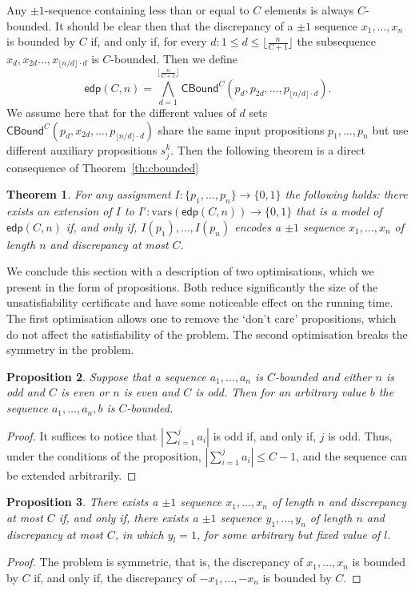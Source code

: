 \documentclass{article} \usepackage[utf8]{inputenc}
\newcommand*{\csf}{\ensuremath{{s}}}
\newcommand*{\vars}{\ensuremath{\mathrm{vars}}}
\newcommand*{\CBound}{\ensuremath{\mathsf{CBound}}}
\newcommand*{\edp}{\ensuremath{\mathsf{edp}}}
\newtheorem{theorem}{Theorem}
\newtheorem{proposition}[theorem]{Proposition}
\begin{document}
Any $\pm1$-sequence containing less than or equal to $C$ elements is always $C$-bounded.
It should be clear then that the discrepancy of a $\pm1$ sequence $x_1,\dots,
x_n$ is bounded by $C$ if, and only if, for every $d: 1\leq d \leq
\lfloor\frac{n}{C+1}\rfloor$ the subsequence $x_d, x_{2d}\dots, x_{\lfloor n/d
\rfloor\cdot d}$ is $C$-bounded.
Then we define
\begin{equation}\label{eq:edp}
\edp(C,n) = \bigwedge_{d=1}^{\lfloor\frac{n}{C+1}\rfloor}\CBound^C(p_d, p_{2d},\dots, p_{\lfloor n/d\rfloor\cdot d}).
\end{equation}
We assume here that for the different values of $d$ sets
$\CBound^C(p_d, x_{2d},\dots, p_{\lfloor n/d\rfloor\cdot d})$ share the same input
propositions $p_1,\dots, p_n$ but use different auxiliary propositions
$\csf^k_j$.  Then the following theorem is a direct consequence of
Theorem~\ref{th:cbounded}
\begin{theorem}\label{th:discrepancy}
For any assignment $I:\{p_1,\dots,p_n\}\to\{0,1\}$ the following holds: 
there exists an extension of $I$ to $I': \vars(\edp(C,n))\to\{0,1\}$ that is 
a model of $\edp(C,n)$ if, and only if, 
$I(p_1),\dots, I(p_n)$ encodes a 
$\pm1$ sequence $x_1,\dots, x_n$ of length $n$ and discrepancy at most $C$.
\end{theorem}

We conclude this section with a description of two optimisations, which we
present in the form of propositions. Both  reduce significantly the size of 
the unsatisfiability certificate and have some noticeable effect on the running
time.  The first optimisation allows one to remove the `don't care'
propositions, which do not affect the satisfiability of the problem. The second
optimisation breaks the symmetry in the problem.


\begin{proposition}\label{prop:oddeven}
Suppose that a sequence $a_1,\dots, a_n$ is $C$-bounded and either
$n$ is odd and $C$ is even or 
$n$ is even and $C$ is odd.
Then for an arbitrary value $b$ the sequence
$a_1,\dots, a_n, b$ is $C$-bounded.
\end{proposition}
\begin{proof}
It suffices to notice that $|\sum_{i=1}^j a_i|$ is odd if, and only if, $j$  is
odd. Thus, under the conditions of the proposition,  
$|\sum_{i=1}^j a_i|\leq C-1$, and the sequence can be extended arbitrarily.  
\end{proof}
\begin{proposition}\label{prop:symmetry}
There exists a $\pm1$ sequence $x_1,\dots, x_n$ of length $n$ and discrepancy
at most $C$ if, and only if, there exists a $\pm1$ sequence $y_1,\dots, y_n$ of
length $n$ and discrepancy at most $C$, in which $y_l = 1$, for some arbitrary
but fixed value of $l$.
\end{proposition}
\begin{proof}
The problem is symmetric, that is, the discrepancy of  $x_1,\dots, x_n$ 
is bounded by $C$ if, and only if, the discrepancy of $-x_1,\dots, -x_n$ is bounded by $C$.
\end{proof}
\end{document}
